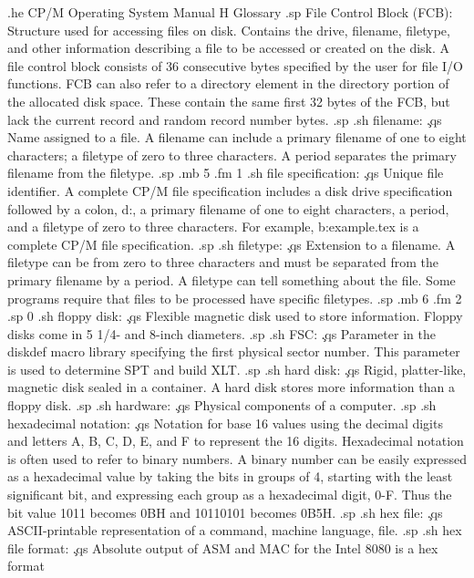.he CP/M Operating System Manual                          H  Glossary
.sp
File Control Block (FCB):
Structure used for accessing files on disk.  Contains the drive, 
filename, filetype, and other information describing a file to be 
accessed or created on the disk.  A file control block consists 
of 36 consecutive bytes specified by the user for file I/O 
functions.  FCB can also refer to a directory element in the 
directory portion of the allocated disk space.  These contain the 
same first 32 bytes of the FCB, but lack the current record and 
random record number bytes.
.sp
.sh
filename:  \c
.qs
Name assigned to a file.  A filename can include a primary 
filename of one to eight characters; a filetype of zero to three characters.
A period separates the primary filename from the filetype.
.sp
.mb 5
.fm 1
.sh
file specification:  \c
.qs
Unique file identifier.  A complete CP/M file specification 
includes a disk drive specification followed by a colon, d:, a 
primary filename of one to eight characters, a period, and a filetype of 
zero to three characters.  For example, b:example.tex is a complete CP/M 
file specification.
.sp
.sh
filetype:  \c
.qs
Extension to a filename.  A filetype can be from zero to three 
characters and must be separated from the primary filename by a 
period.  A filetype can tell something about the file.  Some 
programs require that files to be processed have specific 
filetypes.
.sp
.mb 6
.fm 2
.sp 0
.sh
floppy disk:  \c
.qs
Flexible magnetic disk used to store information.  Floppy disks 
come in 5 1/4- and 8-inch diameters.
.sp
.sh
FSC:  \c
.qs
Parameter in the diskdef macro library specifying the first 
physical sector number.  This parameter is used to determine SPT 
and build XLT.
.sp
.sh
hard disk:  \c
.qs
Rigid, platter-like, magnetic disk sealed in a container.  A hard 
disk stores more information than a floppy disk.
.sp
.sh
hardware:  \c
.qs
Physical components of a computer.
.sp
.sh
hexadecimal notation:  \c
.qs
Notation for base 16 values using the decimal digits and letters 
A, B, C, D, E, and F to represent the 16 digits.  Hexadecimal 
notation is often used to refer to binary numbers.  A binary 
number can be easily expressed as a hexadecimal value by taking 
the bits in groups of 4, starting with the least significant bit, 
and expressing each group as a hexadecimal digit, 0-F.  Thus the 
bit value 1011 becomes 0BH and 10110101 becomes 0B5H.
.sp
.sh
hex file:  \c
.qs
ASCII-printable representation of a command, machine language, 
file.
.sp
.sh
hex file format:  \c
.qs
Absolute output of ASM and MAC for the Intel 8080 is a hex format 
